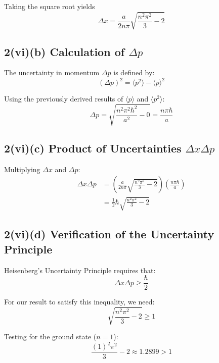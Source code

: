 \documentclass{article}
\begin{document}
Taking the square root yields
\begin{equation*}
\Delta x = \frac{a}{2n\pi} \sqrt{\frac{n^2\pi^2}{3} - 2}
\end{equation*}

\subsection*{2(vi)(b) Calculation of $\Delta p$}

The uncertainty in momentum $\Delta p$ is defined by:
\begin{equation*}
(\Delta p)^2 = \langle p^2 \rangle - \langle p \rangle^2
\end{equation*}

Using the previously derived results of $\langle p \rangle$ and $\langle p^2 \rangle$:
\begin{equation*}
\Delta p = \sqrt{\frac{n^2\pi^2\hbar^2}{a^2} - 0} = \frac{n\pi\hbar}{a}
\end{equation*}

\subsection*{2(vi)(c) Product of Uncertainties $\Delta x \Delta p$}

Multiplying $\Delta x$ and $\Delta p$:
\begin{align*}
\Delta x \Delta p &= \left( \frac{a}{2n\pi} \sqrt{\frac{n^2\pi^2}{3} - 2} \right) \left( \frac{n\pi\hbar}{a} \right) \\
&= \frac{1}{2}\hbar \sqrt{\frac{n^2\pi^2}{3} - 2}
\end{align*}

\subsection*{2(vi)(d) Verification of the Uncertainty Principle}

Heisenberg's Uncertainty Principle requires that:
\begin{equation*}
\Delta x \Delta p \ge \frac{\hbar}{2}
\end{equation*}

For our result to satisfy this inequality, we need:
\begin{equation*}
\sqrt{\frac{n^2\pi^2}{3} - 2} \ge 1
\end{equation*}

Testing for the ground state ($n = 1$):
\begin{equation*}
\frac{(1)^2\pi^2}{3} - 2 \approx 1.2899 > 1
\end{equation*}
\end{document}
